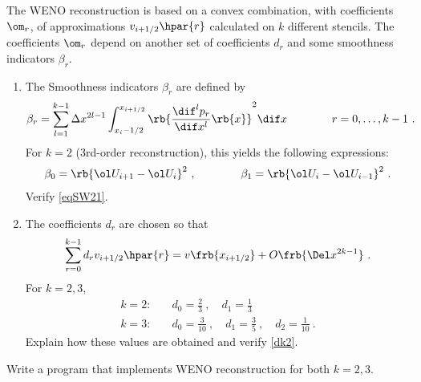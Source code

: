 \documentclass{article}
\begin{document}








\begin{exerciseList}


\item
The WENO reconstruction is based on a convex combination, with coefficients $\om_r$, of approximations $v_{i+1/2}\hpar{r}$ calculated on $k$ different stencils.
The coefficients $\om_r$ depend on another set of coefficients $d_r$ and some smoothness indicators $\beta_r$.

\begin{enumerate}



\item
The Smoothness indicators $\beta_r$ are defined by
\begin{gather} \label{smWts}
	\beta_r=\sum_{l=1}^{k-1}\Delta x^{2l-1}
		\int_{x_i-1/2}^{x_{i+1/2} }\rb{\frac{\dif^lp_r}{\dif x^l}\rb{x}}^2\dif x
	\qquad\qquad r=0,\ldots,k-1\ .
\end{gather}%
For $k=2$ (3rd-order reconstruction), this yields the following expressions:
\begin{gather} \label{eqSW21}
	\beta_0 =\rb{\ol U_{i+1}-\ol U_{i}}^2\ ,
	\qquad\qquad
	\beta_1 =\rb{\ol U_{i}-\ol U_{i-1}}^2\ .
\end{gather}%
Verify \eqref{eqSW21}.


\item
The coefficients $d_r$ are chosen so that
\begin{gather}%
	\sum_{r=0}^{k-1} d_rv_{i+1/2}\hpar{r}=v\frb{x_{i+1/2}}+O\frb{\Del x^{2k-1}}\ .
\end{gather}%
For $k=2,3$,
\begin{align}
\label{dk2}
	k=2: \quad & d_{0}=\frac{2}{3}\ ,\quad d_{1}=\frac{1}{3}\\
	k=3: \quad & d_{0}=\frac{3}{10}\ ,\quad d_{1}=\frac{3}{5}\ ,\quad d_{2}=\frac{1}{10}\ .
\end{align}
Explain how these values are obtained and verify \eqref{dk2}.

\end{enumerate}

\item
Write a program that implements WENO reconstruction for both $k=2,3$.


\end{exerciseList}
\end{document}
